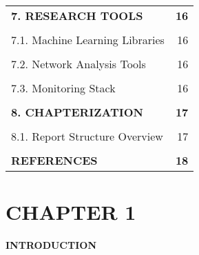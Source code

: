 \documentclass[12pt]{article}
\newcommand{\centersection}[1]{%
  \begin{center}
    \fontfamily{ptm}\fontsize{14}{16}\selectfont\bfseries\uppercase{#1}
  \end{center}
}
\begin{document}
\begin{spacing}{1.0}
\begin{tabular}{@{} p{} r @{}}
\textbf{7. RESEARCH TOOLS} & \textbf{16} \\
\vspace{0.1cm} & \\
\hspace{1em}7.1. Machine Learning Libraries & 16 \\
\vspace{0.1cm} & \\
\hspace{1em}7.2. Network Analysis Tools & 16 \\
\vspace{0.1cm} & \\
\hspace{1em}7.3. Monitoring Stack & 16 \\
\vspace{0.2cm} & \\

\textbf{8. CHAPTERIZATION} & \textbf{17} \\
\vspace{0.1cm} & \\
\hspace{1em}8.1. Report Structure Overview & 17 \\
\vspace{0.2cm} & \\

\textbf{REFERENCES} & \textbf{18} \\
\end{tabular}
\end{spacing}
\newpage
\section*{CHAPTER 1}
\centersection{INTRODUCTION}
\end{document}
